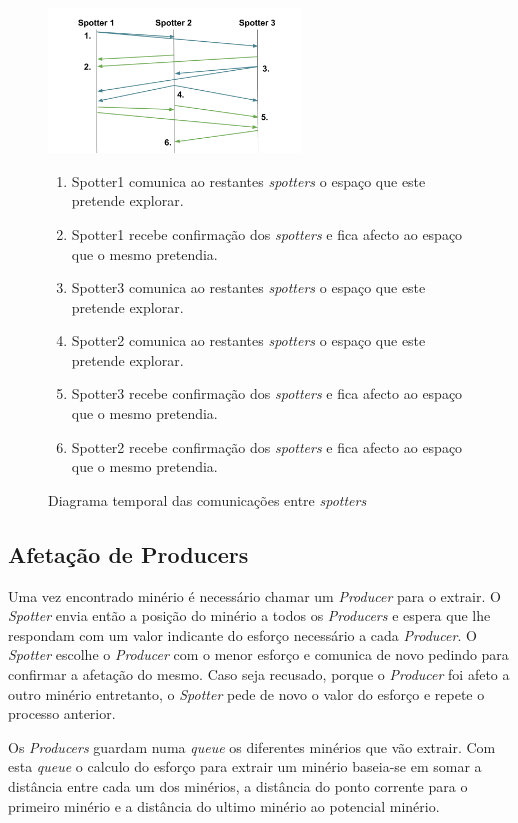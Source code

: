 \documentclass[12pt]{report}
\begin{document}
\begin{figure}[h]
  \centering
    \includegraphics[width=0.6\textwidth]{spotter-agreement}
  \caption{\small{Diagrama temporal das comunicações entre \textit{spotters}}}
  
  \begin{enumerate}
    \item Spotter1 comunica ao restantes \textit{spotters} o espaço que este pretende explorar.
    \item Spotter1 recebe confirmação dos \textit{spotters} e fica afecto ao espaço que o mesmo pretendia.
    \item Spotter3 comunica ao restantes \textit{spotters} o espaço que este pretende explorar.
    \item Spotter2 comunica ao restantes \textit{spotters} o espaço que este pretende explorar.
    \item Spotter3 recebe confirmação dos \textit{spotters} e fica afecto ao espaço que o mesmo pretendia.
    \item Spotter2 recebe confirmação dos \textit{spotters} e fica afecto ao espaço que o mesmo pretendia.
  \end{enumerate}
\end{figure}

\FloatBarrier
\subsection{Afetação de Producers}
Uma vez encontrado minério é necessário chamar um \textit{Producer} para o extrair. O \textit{Spotter} envia então a posição do 
minério a todos os \textit{Producers} e espera que lhe respondam com um valor indicante do esforço necessário a cada \textit{Producer}.
O \textit{Spotter} escolhe o \textit{Producer} com o menor esforço e comunica de novo pedindo para confirmar a afetação do mesmo.
Caso seja recusado, porque o \textit{Producer} foi afeto a outro minério entretanto, o \textit{Spotter} pede de novo o valor do esforço
e repete o processo anterior.

Os \textit{Producers} guardam numa \textit{queue} os diferentes minérios que vão extrair. Com esta \textit{queue} o calculo do esforço
para extrair um minério baseia-se em somar a distância entre cada um dos minérios, a distância do ponto corrente para o primeiro
minério e a distância do ultimo minério ao potencial minério.
\end{document}
